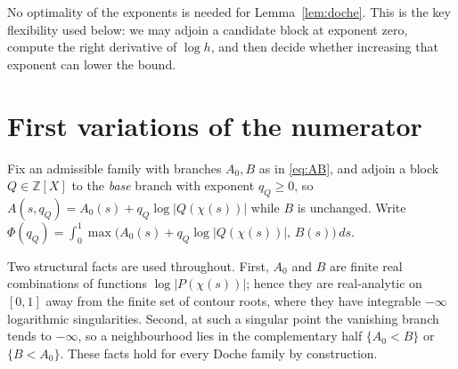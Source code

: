 \documentclass[11pt,reqno]{amsart}
\theoremstyle{plain}
\theoremstyle{definition}
\theoremstyle{remark}
\newcommand{\Z}{\mathbb{Z}}
\begin{document}
No optimality of the exponents is needed for Lemma~\ref{lem:doche}.  This is the key
flexibility used below: we may adjoin a candidate block at exponent zero, compute the
right derivative of $\log h$, and then decide whether increasing that exponent can
lower the bound.

\section{First variations of the numerator}\label{sec:firstvar}

Fix an admissible family with branches $A_0,B$ as in \eqref{eq:AB}, and adjoin a
block $Q\in\Z[X]$ to the \emph{base} branch with exponent $q_Q\ge0$, so
$A(s,q_Q)=A_0(s)+q_Q\log|Q(\chi(s))|$ while $B$ is unchanged. Write
$\Phi(q_Q)=\int_0^1\max\bigl(A_0(s)+q_Q\log|Q(\chi(s))|,\,B(s)\bigr)\,ds$.

Two structural facts are used throughout.  First, $A_0$ and $B$ are finite real
combinations of functions $\log|P(\chi(s))|$; hence they are real-analytic on
$[0,1]$ away from the finite set of contour roots, where they have integrable
$-\infty$ logarithmic singularities.  Second, at such a singular point the vanishing
branch tends to $-\infty$, so a neighbourhood lies in the complementary half
$\{A_0<B\}$ or $\{B<A_0\}$.  These facts hold for every Doche family by construction. 
\end{document}
